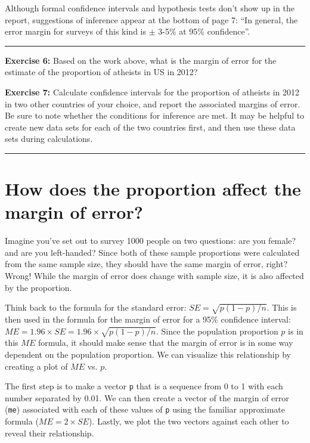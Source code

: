 \documentclass[]{book}
\theoremstyle{definition}
\theoremstyle{definition}
\theoremstyle{definition}
\theoremstyle{remark}
\begin{document}
Although formal confidence intervals and hypothesis tests don't show up
in the report, suggestions of inference appear at the bottom of page 7:
``In general, the error margin for surveys of this kind is \(\pm\) 3-5\%
at 95\% confidence''.

\begin{center}\rule{0.5\linewidth}{\linethickness}\end{center}

\textbf{Exercise 6:} Based on the work above, what is the margin of
error for the estimate of the proportion of atheists in US in 2012?

\textbf{Exercise 7:} Calculate confidence intervals for the proportion
of atheists in 2012 in two other countries of your choice, and report
the associated margins of error. Be sure to note whether the conditions
for inference are met. It may be helpful to create new data sets for
each of the two countries first, and then use these data sets during
calculations.

\begin{center}\rule{0.5\linewidth}{\linethickness}\end{center}

\hypertarget{how-does-the-proportion-affect-the-margin-of-error}{%
\section{How does the proportion affect the margin of
error?}\label{how-does-the-proportion-affect-the-margin-of-error}}

Imagine you've set out to survey 1000 people on two questions: are you
female? and are you left-handed? Since both of these sample proportions
were calculated from the same sample size, they should have the same
margin of error, right? Wrong! While the margin of error does change
with sample size, it is also affected by the proportion.

Think back to the formula for the standard error:
\(SE = \sqrt{p(1-p)/n}\). This is then used in the formula for the
margin of error for a 95\% confidence interval:
\(ME = 1.96\times SE = 1.96\times\sqrt{p(1-p)/n}\). Since the population
proportion \(p\) is in this \(ME\) formula, it should make sense that
the margin of error is in some way dependent on the population
proportion. We can visualize this relationship by creating a plot of
\(ME\) vs. \(p\).

The first step is to make a vector \texttt{p} that is a sequence from 0
to 1 with each number separated by 0.01. We can then create a vector of
the margin of error (\texttt{me}) associated with each of these values
of \texttt{p} using the familiar approximate formula
(\(ME = 2 \times SE\)). Lastly, we plot the two vectors against each
other to reveal their relationship.
\end{document}
